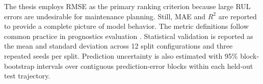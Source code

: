 The thesis employs RMSE as the primary ranking criterion because large RUL errors are undesirable for maintenance planning. Still, MAE and $R^2$ are reported to provide a complete picture of model behavior. The metric definitions follow common practice in prognostics evaluation \cite{saxena2008}. Statistical validation is reported as the mean and standard deviation across 12 split configurations and three repeated seeds per split. Prediction uncertainty is also estimated with 95\% block-bootstrap intervals over contiguous prediction-error blocks within each held-out test trajectory.

